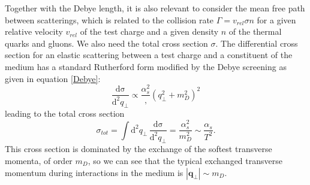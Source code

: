 \documentclass[a4paper,12pt]{article}
\numberwithin{equation}{section}
\begin{document}
Together with the Debye length, it is also relevant to consider the mean free path between scatterings, which is related to the collision rate $\Gamma=v_{rel}\sigma n $ for a given relative velocity $v_{rel}$ of the test charge and a given density $n$ of the thermal quarks and gluons. We also need the total cross section $\sigma$. The differential cross section for an elastic scattering between a test charge and a constituent of the medium has a standard Rutherford form modified by the Debye screening as given in equation \eqref{Debye}:
\begin{equation}
\frac{\mathrm{d\sigma}}{\mathrm{d}^2q_\perp}\propto\frac{\alpha_s^2},{(q_\perp^2+m_D^2)^2}
\end{equation}
leading to the total cross section 
\begin{equation}
\sigma_{tot}=\int \mathrm{d}^2q_\perp\,\frac{\mathrm{d\sigma}}{\mathrm{d}^2q_\perp}=\frac{\alpha_s^2}{m_D^2}\sim\frac{\alpha_s}{T^2}.
\end{equation}
This cross section is dominated by the exchange of the softest transverse momenta, of order $m_D$, so we can see that the typical exchanged transverse momentum during interactions in the medium is $|\mathbf{q}_\perp|\sim m_D$. 
\end{document}
